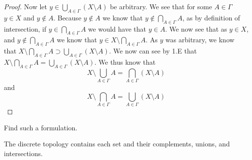 \begin{proof}
Now let $y \in \bigcup_{A\in\Gamma} (X\setminus A)$ be arbitrary. We
see that for some $A \in\Gamma$ $y \in X$ and $y\notin A$. Because
$y\notin A$ we know that $y\notin \bigcap_{A\in\Gamma} A$, as by
definition of intersection, if  $y\in \bigcap_{A\in\Gamma} A$ we would
have that $y\in A$. We now see that as $y\in X$, and $y \notin
\bigcap_{A\in\Gamma} A$ we know that $y \in X \setminus \bigcap_{A \in
  \Gamma} A$. As $y$ was arbitrary, we know that  
$X \setminus \bigcap_{A \in \Gamma} A \supset \bigcup_{A\in\Gamma} 
(X\setminus A)$. We now can see by 1.E that  
$X \setminus \bigcap_{A \in \Gamma} A = \bigcup_{A\in\Gamma}
(X\setminus A)$.
We thus know that 
$$X \setminus \bigcup_{A \in \Gamma} A = \bigcap_{A\in\Gamma} (X \setminus A) $$
and
$$X \setminus \bigcap_{A \in \Gamma} A = \bigcup_{A\in\Gamma} (X \setminus A) $$
\end{proof}

\begin{minorEx}
    [Riddle]
    Find such a formulation.
\end{minorEx}
The discrete topology contains each set and their complements, unions, and intersections.
